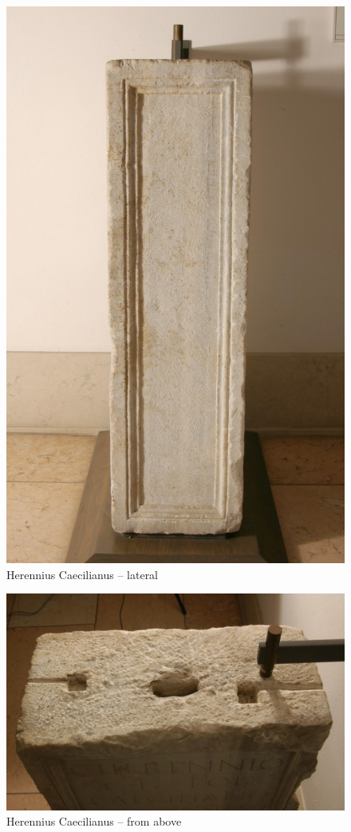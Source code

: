 \documentclass[amsthm,ebook]{saparticle}
\begin{document}
\begin{figure}[!bp]
\centering
 \includegraphics[scale=0.6]{images/fig06}
\caption{Herennius Caecilianus -- lateral}
\label{fig:6}
\end{figure}

\begin{figure}[!bp]
\centering
 \includegraphics[scale=0.46]{images/fig07}
\caption{Herennius Caecilianus -- from above}
\label{fig:7}
\end{figure}
\end{document}
